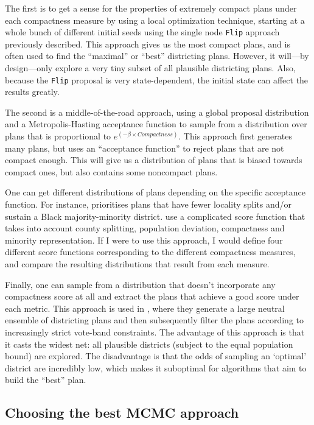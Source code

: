 \documentclass[]{article}
\begin{document}
The first is to get a sense for the properties of extremely compact
plans under each compactness measure by using a local optimization
technique, starting at a whole bunch of different initial seeds using
the single node \texttt{Flip} approach previously described. This
approach gives us the most compact plans, and is often used to find the
``maximal'' or ``best'' districting plans. However, it will---by
design---only explore a very tiny subset of all plausible districting
plans. Also, because the \texttt{Flip} proposal is very state-dependent,
the initial state can affect the results greatly.

The second is a middle-of-the-road approach, using a global proposal
distribution and a Metropolis-Hasting acceptance function to sample from
a distribution over plans that is proportional to
\(e^{(-\beta \times Compactness)}\). This approach first generates many
plans, but uses an ``acceptance function'' to reject plans that are not
compact enough. This will give us a distribution of plans that is biased
towards compact ones, but also contains some noncompact plans.

One can get different distributions of plans depending on the specific
acceptance function. For instance, \cite{dd2019va} prioritises plans
that have fewer locality splits and/or sustain a Black majority-minority
district. \cite{h2018} use a complicated score function that takes into
account county splitting, population deviation, compactness and minority
representation. If I were to use this approach, I would define four
different score functions corresponding to the different compactness
measures, and compare the resulting distributions that result from each
measure.

Finally, one can sample from a distribution that doesn't incorporate any
compactness score at all and extract the plans that achieve a good score
under each metric. This approach is used in \cite{ddj2019comp}, where
they generate a large neutral ensemble of districting plans and then
subsequently filter the plans according to increasingly strict vote-band
constraints. The advantage of this approach is that it casts the widest
net: all plausible districts (subject to the equal population bound) are
explored. The disadvantage is that the odds of sampling an `optimal'
district are incredibly low, which makes it suboptimal for algorithms
that aim to build the ``best'' plan.

\hypertarget{choosing-the-best-mcmc-approach}{%
\subsection{Choosing the best MCMC
approach}\label{choosing-the-best-mcmc-approach}}
\end{document}
